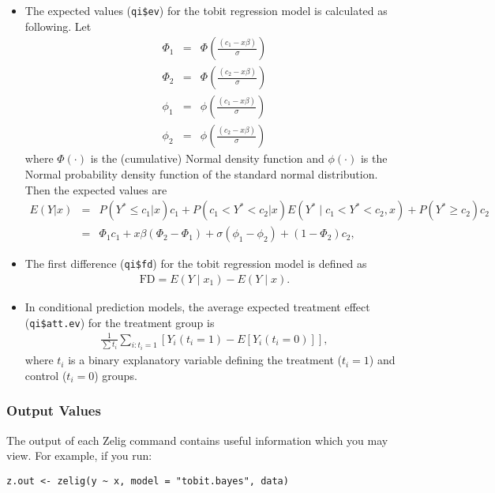 \begin{itemize}
\item The expected values (\texttt{qi\$ev}) for the tobit regression model is
calculated as following.  Let
\begin{eqnarray*}
\Phi_1 &=& \Phi\left(\frac{(c_1 - x \beta)}{\sigma}\right) \\
\Phi_2 &=& \Phi\left(\frac{(c_2 - x \beta)}{\sigma}\right) \\ 
\phi_1 &=& \phi\left(\frac{(c_1 - x \beta)}{\sigma}\right) \\
\phi_2 &=& \phi\left(\frac{(c_2 - x \beta)}{\sigma}\right) 
\end{eqnarray*}
where $\Phi(\cdot)$ is the (cumulative) Normal density function and
$\phi(\cdot)$ is the Normal probability density function of the
standard normal distribution.  Then the expected values are
\begin{eqnarray*}
E(Y|x) &=& P(Y^* \le c_1|x) c_1+P(c_1<Y^*<c_2|x) E(Y^* \mid c_1<Y^*<c_2, x)+P(Y^* \ge c_2) c_2 \\
   &=& \Phi_{1}c_1 + x \beta(\Phi_{2}-\Phi_{1}) + \sigma (\phi_1 -\phi_2) + (1-\Phi_2) c_2,
\end{eqnarray*}

\item The first difference (\texttt{qi\$fd}) for the tobit regression
model is defined as
\begin{eqnarray*}
\text{FD}=E(Y\mid x_{1})-E(Y\mid x).
\end{eqnarray*}

\item In conditional prediction models, the average expected treatment effect
(\texttt{qi\$att.ev}) for the treatment group is
\begin{eqnarray*}
\frac{1}{\sum t_{i}}\sum_{i:t_{i}=1}[Y_{i}(t_{i}=1)-E[Y_{i}(t_{i}=0)]],
\end{eqnarray*}
where $t_{i}$ is a binary explanatory variable defining the treatment
($t_{i}=1$) and control ($t_{i}=0$) groups. 

\end{itemize}

\subsubsection{Output Values}

The output of each Zelig command contains useful information which you may
view. For example, if you run:
\begin{verbatim}
z.out <- zelig(y ~ x, model = "tobit.bayes", data)
\end{verbatim}

